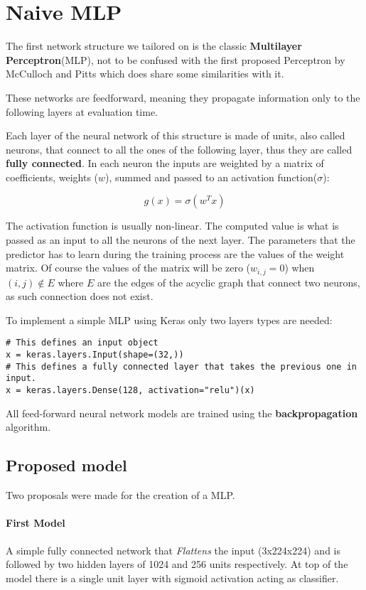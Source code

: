 \newpage
\section{Naive MLP}
\label{sec:naive-mlp}

The first network structure we tailored on is the classic \textbf{Multilayer Perceptron}(MLP), not to be confused with
the first proposed Perceptron by McCulloch and Pitts\cite{mcculloch43a} which does share some similarities with it.

These networks are feedforward, meaning they propagate information only to the following layers at evaluation time.

Each layer of the neural network of this structure is made of units, also called neurons, that connect
to all the ones of the following layer, thus they are called \textbf{fully connected}.
In each neuron the inputs are weighted by a matrix of coefficients, weights ($w$), summed and passed to an activation function($\sigma$):

\[g(x) = \sigma(w^Tx)\]

The activation function is usually non-linear. The computed value is what is passed as an input to all the neurons of the next layer.
The parameters that the predictor has to learn during the training process are the values of the weight matrix.
Of course the values of the matrix will be zero ($w_{i,j} = 0$) when $(i,j) \notin E$ where $E$ are the edges of the acyclic graph
that connect two neurons, as such connection does not exist.

To implement a simple MLP using Keras only two layers types are needed:
\begin{verbatim}
# This defines an input object
x = keras.layers.Input(shape=(32,))
# This defines a fully connected layer that takes the previous one in input.
x = keras.layers.Dense(128, activation="relu")(x)
\end{verbatim}

All feed-forward neural network models are trained using the \textbf{backpropagation} algorithm\cite{kelley1960gradient}.

\subsection{Proposed model}
Two proposals were made for the creation of a MLP.

\paragraph{First Model}
A simple fully connected network that \textit{Flattens} the input (3x224x224) and is followed by two hidden layers
of 1024 and 256 units respectively. At top of the model there is a single unit layer with sigmoid activation acting as classifier.

